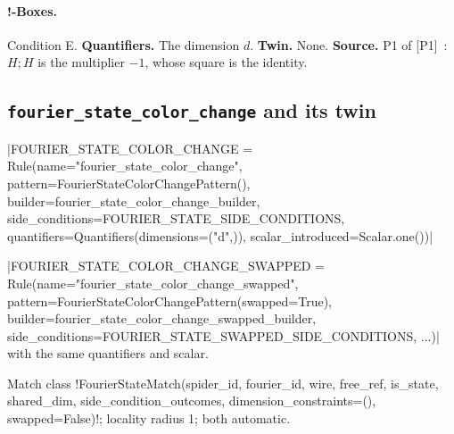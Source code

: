 \paragraph{!-Boxes.} Condition E. \textbf{Quantifiers.} The dimension $d$. \textbf{Twin.} None. \textbf{Source.} P1 of [P1]~\cite{poor2023zxw}: $H;H$ is the multiplier $-1$, whose square is the identity.

\subsection{\texttt{fourier\_state\_color\_change} and its twin}\label{sec:rules-fourier-state}

\begin{signature}
\py|FOURIER_STATE_COLOR_CHANGE = Rule(name="fourier_state_color_change", pattern=FourierStateColorChangePattern(), builder=fourier_state_color_change_builder, side_conditions=FOURIER_STATE_SIDE_CONDITIONS, quantifiers=Quantifiers(dimensions=("d",)), scalar_introduced=Scalar.one())|

\py|FOURIER_STATE_COLOR_CHANGE_SWAPPED = Rule(name="fourier_state_color_change_swapped", pattern=FourierStateColorChangePattern(swapped=True), builder=fourier_state_color_change_swapped_builder, side_conditions=FOURIER_STATE_SWAPPED_SIDE_CONDITIONS, ...)| with the same quantifiers and scalar.

Match class \py!FourierStateMatch(spider_id, fourier_id, wire, free_ref, is_state, shared_dim, side_condition_outcomes, dimension_constraints=(), swapped=False)!; locality radius 1; both automatic.
\end{signature}

